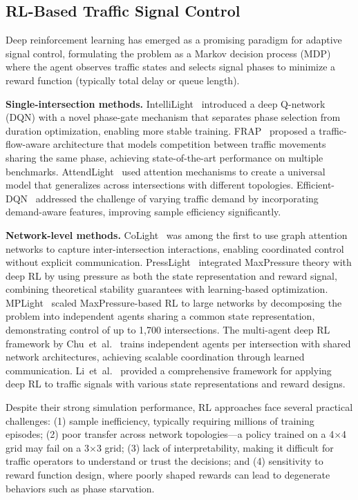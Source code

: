 \documentclass[conference]{IEEEtran}
\begin{document}
\subsection{RL-Based Traffic Signal Control}
Deep reinforcement learning has emerged as a promising paradigm for adaptive signal control, formulating the problem as a Markov decision process (MDP)~\cite{sutton2018} where the agent observes traffic states and selects signal phases to minimize a reward function (typically total delay or queue length).

\textbf{Single-intersection methods.} IntelliLight~\cite{wei2019} introduced a deep Q-network (DQN) with a novel phase-gate mechanism that separates phase selection from duration optimization, enabling more stable training. FRAP~\cite{zheng2019} proposed a traffic-flow-aware architecture that models competition between traffic movements sharing the same phase, achieving state-of-the-art performance on multiple benchmarks. AttendLight~\cite{oroojlooy2020attendlight} used attention mechanisms to create a universal model that generalizes across intersections with different topologies. Efficient-DQN~\cite{wei2020efficientdqn} addressed the challenge of varying traffic demand by incorporating demand-aware features, improving sample efficiency significantly.

\textbf{Network-level methods.} CoLight~\cite{wei2019colight} was among the first to use graph attention networks to capture inter-intersection interactions, enabling coordinated control without explicit communication. PressLight~\cite{wei2019presslight} integrated MaxPressure theory with deep RL by using pressure as both the state representation and reward signal, combining theoretical stability guarantees with learning-based optimization. MPLight~\cite{chen2020mplight} scaled MaxPressure-based RL to large networks by decomposing the problem into independent agents sharing a common state representation, demonstrating control of up to 1,700 intersections. The multi-agent deep RL framework by Chu~et~al.~\cite{chu2020} trains independent agents per intersection with shared network architectures, achieving scalable coordination through learned communication. Li~et~al.~\cite{li2021} provided a comprehensive framework for applying deep RL to traffic signals with various state representations and reward designs.

Despite their strong simulation performance, RL approaches face several practical challenges: (1) sample inefficiency, typically requiring millions of training episodes; (2) poor transfer across network topologies---a policy trained on a 4$\times$4 grid may fail on a 3$\times$3 grid; (3) lack of interpretability, making it difficult for traffic operators to understand or trust the decisions; and (4) sensitivity to reward function design, where poorly shaped rewards can lead to degenerate behaviors such as phase starvation.
\end{document}
